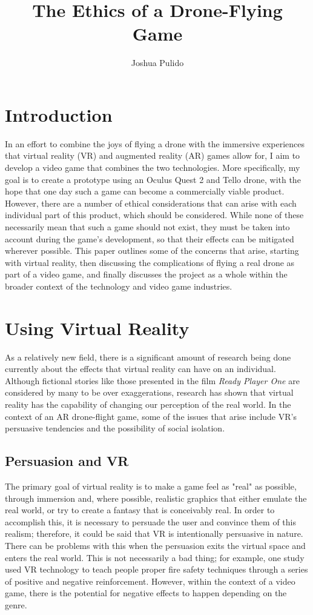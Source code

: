 \documentclass[10pt,twocolumn]{article}
\title{The Ethics of a Drone-Flying Game}
\author{Joshua Pulido}
\affiliation{Occidental College}
\begin{document}
\maketitle

\section{Introduction}
In an effort to combine the joys of flying a drone with the immersive experiences that virtual reality (VR) and augmented reality (AR) games allow for, I aim to develop a video game that combines the two technologies. More specifically, my goal is to create a prototype using an Oculus Quest 2 and Tello drone, with the hope that one day such a game can become a commercially viable product. However, there are a number of ethical considerations that can arise with each individual part of this product, which should be considered. While none of these necessarily mean that such a game should not exist, they must be taken into account during the game's development, so that their effects can be mitigated wherever possible. This paper outlines some of the concerns that arise, starting with virtual reality, then discussing the complications of flying a real drone as part of a video game, and finally discusses the project as a whole within the broader context of the technology and video game industries.

\section{Using Virtual Reality}

As a relatively new field, there is a significant amount of research being done currently about the effects that virtual reality can have on an individual. Although fictional stories like those presented in the film \emph{Ready Player One} are considered by many to be over exaggerations, research has shown that virtual reality has the capability of changing our perception of the real world. In the context of an AR drone-flight game, some of the issues that arise include VR's persuasive tendencies and the possibility of social isolation.
\subsection{Persuasion and VR}
The primary goal of virtual reality is to make a game feel as "real" as possible, through  immersion and, where possible, realistic graphics that either emulate the real world, or try to create a fantasy that is conceivably real. In order to accomplish this, it is necessary to persuade the user and convince them of this realism; therefore, it could be said that VR is intentionally persuasive in nature. There can be problems with this when the persuasion exits the virtual space and enters the real world. This is not necessarily a bad thing; for example, one study used VR technology to teach people proper fire safety techniques through a series of positive and negative reinforcement\cite{PersuasiveVR}. However, within the context of a video game, there is the potential for negative effects to happen depending on the genre.
\end{document}
